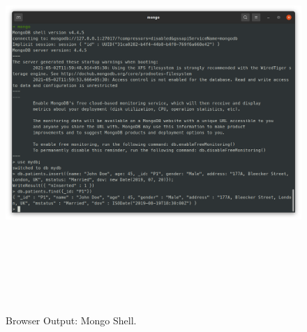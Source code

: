 \documentclass[12pt, a4]{article}
\begin{document}
\newpage
\subsection*{}
\begin{figure}[h]
\centering
\caption{Browser Output: Mongo Shell.}
\includegraphics[height=15cm, width=18cm]{Output/MongoOP.png}
\end{figure}

\newpage
\end{document}
